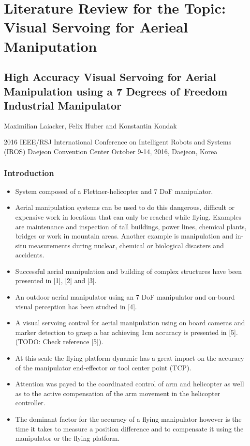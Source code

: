 \documentclass[a4paper, 11pt]{report}
\begin{document}
\chapter{Literature Review for the Topic: Visual Servoing for Aerieal Maniputation}

\section{High Accuracy Visual Servoing for Aerial Manipulation using a 7 Degrees of Freedom Industrial Manipulator}

Maximilian Laiacker, Felix Huber and Konstantin Kondak

2016 IEEE/RSJ International Conference on Intelligent Robots and Systems (IROS) 
Daejeon Convention Center
October 9-14, 2016, Daejeon, Korea

\subsection{Introduction}

\begin{itemize}
	\item  System composed of a Flettner-helicopter and 7 DoF manipulator.
	\item Aerial manipulation systems can be used to do this dangerous, difficult or expensive work in locations that can only be reached while flying. Examples are maintenance and inspection of tall buildings, power lines, chemical plants, bridges or work in mountain areas. Another example is manipulation and in-situ measurements during nuclear, chemical or biological disasters and accidents.
	\item Successful aerial manipulation and building of complex structures have been presented in [1], [2] and [3].
	\item An outdoor aerial manipulator using an 7 DoF manipulator and on-board visual perception has been studied in [4].
	\item A visual servoing control for aerial manipulation using on board cameras and marker detection to grasp a bar achieving 1cm accuracy is presented in [5]. (TODO: Check reference [5]).
	\item At this scale the flying platform dynamic has a great impact on the accuracy of the manipulator end-effector or tool center point (TCP).
	\item Attention was payed to the coordinated control of arm and helicopter as well as to the active compensation of the arm movement in the helicopter controller.
	\item The dominant factor for the accuracy of a flying manipulator however is the time it takes to measure a position difference and to compensate it using the manipulator or the flying platform.
\end{itemize}
\end{document}
